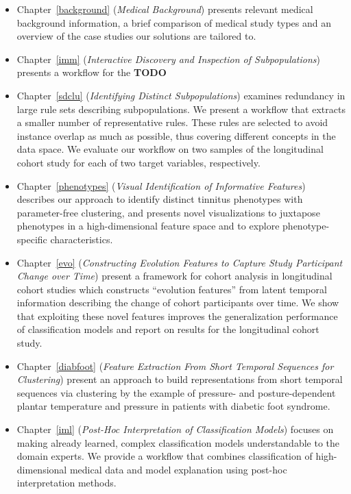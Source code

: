 \documentclass[
  oneside]{book}
\providecommand{\tightlist}{%
  \setlength{\itemsep}{0pt}\setlength{\parskip}{0pt}}
\begin{document}
\begin{itemize}
\tightlist
\item
  Chapter~\ref{background} (\emph{Medical Background}) presents relevant medical background information, a brief comparison of medical study types and an overview of the case studies our solutions are tailored to.
\item
  Chapter~\ref{imm} (\emph{Interactive Discovery and Inspection of Subpopulations}) presents a workflow for the \textbf{TODO}
\item
  Chapter~\ref{sdclu} (\emph{Identifying Distinct Subpopulations}) examines redundancy in large rule sets describing subpopulations. We present a workflow that extracts a smaller number of representative rules. These rules are selected to avoid instance overlap as much as possible, thus covering different concepts in the data space. We evaluate our workflow on two samples of the longitudinal cohort study for each of two target variables, respectively.
\item
  Chapter~\ref{phenotypes} (\emph{Visual Identification of Informative Features}) describes our approach to identify distinct tinnitus phenotypes with parameter-free clustering, and presents novel visualizations to juxtapose phenotypes in a high-dimensional feature space and to explore phenotype-specific characteristics.
\item
  Chapter~\ref{evo} (\emph{Constructing Evolution Features to Capture Study Participant Change over Time}) present a framework for cohort analysis in longitudinal cohort studies which constructs ``evolution features'' from latent temporal information describing the change of cohort participants over time. We show that exploiting these novel features improves the generalization performance of classification models and report on results for the longitudinal cohort study.
\item
  Chapter~\ref{diabfoot} (\emph{Feature Extraction From Short Temporal Sequences for Clustering}) present an approach to build representations from short temporal sequences via clustering by the example of pressure- and posture-dependent plantar temperature and pressure in patients with diabetic foot syndrome.
\item
  Chapter~\ref{iml} (\emph{Post-Hoc Interpretation of Classification Models}) focuses on making already learned, complex classification models understandable to the domain experts. We provide a workflow that combines classification of high-dimensional medical data and model explanation using post-hoc interpretation methods.

\end{itemize}
\end{document}
